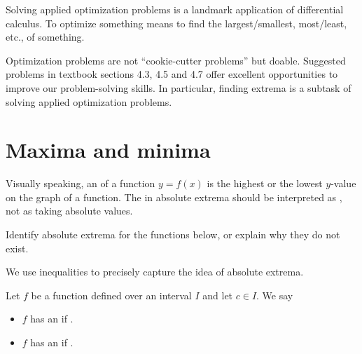 \documentclass[../main.tex]{subfiles}
\begin{document}
 Solving applied optimization problems is a landmark application of differential calculus.  
To optimize something means to find the largest/smallest, most/least, etc., of something. 

Optimization problems are not ``cookie-cutter problems'' but doable. Suggested problems in textbook sections 4.3, 4.5 and 4.7 offer excellent opportunities to improve our problem-solving skills. In particular, finding extrema is a subtask of solving applied optimization problems.

\section{Maxima and minima}

Visually speaking, an  of a function \(y = f(x)\) is the highest or the lowest \(y\)-value on the graph of a function.   The  in absolute extrema should be interpreted as , not as taking absolute values.

\begin{example} \label{ex:abs-extrema}
  Identify absolute extrema for the functions below, or explain why they do not exist.

  \begin{center}
    
    
    
    
  \end{center}

\end{example}

We use inequalities to precisely capture the idea of absolute extrema.
\begin{mdframed}[style=withref-compact]
  Let \(f\) be a function defined over an interval \(I\) and let \(c \in I\).  We say
  \begin{itemize}
    \item \(f\) has an  if \underline{\hspace{2.5in}}.
    \item \(f\) has an  if \underline{\hspace{2.5in}}.
  \end{itemize}
\end{mdframed}
\end{document}
